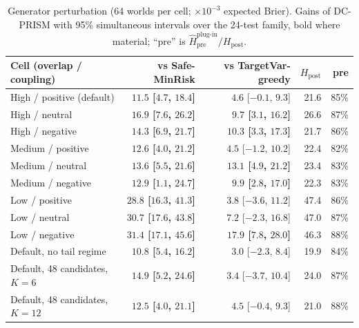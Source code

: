 \documentclass[runningheads]{llncs}
\begin{document}
\begin{table}[t]
\caption{Generator perturbation (64 worlds per cell; $\times10^{-3}$ expected Brier). Gains of DC-PRISM with 95\% simultaneous intervals over the 24-test family, bold where material; ``pre'' is $\widehat H_{\mathrm{pre}}^{\text{plug-in}}/H_{\mathrm{post}}$.}
\label{tab:perturb}
\centering\scriptsize
\setlength{\tabcolsep}{3pt}
\begin{tabular}{lrrrr}
\toprule
Cell (overlap / coupling) & vs Safe-MinRisk & vs TargetVar-greedy & $H_{\mathrm{post}}$ & pre \\
\midrule
High / positive (default) & {\bfseries\boldmath $11.5$ [$4.7$, $18.4$]} & $4.6$ [$-0.1$, $9.3$] & 21.6 & 85\% \\
High / neutral & {\bfseries\boldmath $16.9$ [$7.6$, $26.2$]} & {\bfseries\boldmath $9.7$ [$3.1$, $16.2$]} & 26.6 & 87\% \\
High / negative & {\bfseries\boldmath $14.3$ [$6.9$, $21.7$]} & {\bfseries\boldmath $10.3$ [$3.3$, $17.3$]} & 21.7 & 86\% \\
Medium / positive & {\bfseries\boldmath $12.6$ [$4.0$, $21.2$]} & $4.5$ [$-1.2$, $10.2$] & 22.4 & 82\% \\
Medium / neutral & {\bfseries\boldmath $13.6$ [$5.5$, $21.6$]} & {\bfseries\boldmath $13.1$ [$4.9$, $21.2$]} & 23.4 & 83\% \\
Medium / negative & {\bfseries\boldmath $12.9$ [$1.1$, $24.7$]} & {\bfseries\boldmath $9.9$ [$2.8$, $17.0$]} & 22.3 & 83\% \\
Low / positive & {\bfseries\boldmath $28.8$ [$16.3$, $41.3$]} & $3.8$ [$-3.6$, $11.2$] & 47.4 & 86\% \\
Low / neutral & {\bfseries\boldmath $30.7$ [$17.6$, $43.8$]} & $7.2$ [$-2.3$, $16.8$] & 47.0 & 87\% \\
Low / negative & {\bfseries\boldmath $31.4$ [$17.1$, $45.6$]} & {\bfseries\boldmath $17.9$ [$7.8$, $28.0$]} & 46.3 & 88\% \\
Default, no tail regime & {\bfseries\boldmath $10.8$ [$5.4$, $16.2$]} & $3.0$ [$-2.3$, $8.4$] & 19.9 & 84\% \\
Default, 48 candidates, $K=6$ & {\bfseries\boldmath $14.9$ [$5.2$, $24.6$]} & $3.4$ [$-3.7$, $10.4$] & 24.0 & 87\% \\
Default, 48 candidates, $K=12$ & {\bfseries\boldmath $12.5$ [$4.0$, $21.1$]} & $4.5$ [$-0.4$, $9.3$] & 21.0 & 88\% \\
\bottomrule
\end{tabular}
\end{table}
\end{document}
